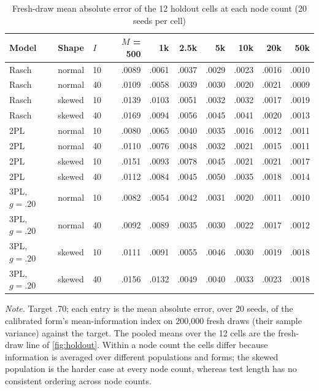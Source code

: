 \begin{table}[!htbp]
\centering
\caption{Fresh-draw mean absolute error of the 12 holdout cells at each node count (20 seeds per cell)}
\label{tab:holdout-cell}
\footnotesize
\setlength{\tabcolsep}{2.2pt}
\begin{tabular}{lllrrrrrrr}
\toprule
Model & Shape & $I$ & $M$ = 500 & 1k & 2.5k & 5k & 10k & 20k & 50k \\
\midrule
Rasch & normal & 10 & .0089 & .0061 & .0037 & .0029 & .0023 & .0016 & .0010 \\
Rasch & normal & 40 & .0109 & .0058 & .0039 & .0030 & .0020 & .0021 & .0009 \\
Rasch & skewed & 10 & .0139 & .0103 & .0051 & .0032 & .0032 & .0017 & .0019 \\
Rasch & skewed & 40 & .0169 & .0094 & .0056 & .0045 & .0041 & .0020 & .0013 \\
2PL & normal & 10 & .0080 & .0065 & .0040 & .0035 & .0016 & .0012 & .0011 \\
2PL & normal & 40 & .0110 & .0076 & .0048 & .0032 & .0021 & .0015 & .0011 \\
2PL & skewed & 10 & .0151 & .0093 & .0078 & .0045 & .0021 & .0021 & .0017 \\
2PL & skewed & 40 & .0112 & .0084 & .0045 & .0050 & .0035 & .0018 & .0014 \\
3PL, $g=.20$ & normal & 10 & .0082 & .0054 & .0042 & .0031 & .0020 & .0011 & .0010 \\
3PL, $g=.20$ & normal & 40 & .0092 & .0089 & .0035 & .0030 & .0022 & .0017 & .0012 \\
3PL, $g=.20$ & skewed & 10 & .0111 & .0091 & .0055 & .0046 & .0030 & .0019 & .0018 \\
3PL, $g=.20$ & skewed & 40 & .0156 & .0132 & .0049 & .0040 & .0033 & .0023 & .0018 \\
\bottomrule
\end{tabular}

\smallskip
\begin{minipage}{0.95\textwidth}
\footnotesize
\emph{Note.} Target .70; each entry is the mean absolute error, over 20 seeds, of the calibrated form's mean-information index on 200,000 fresh draws (their sample variance) against the target. The pooled means over the 12 cells are the fresh-draw line of \cref{fig:holdout}. Within a node count the cells differ because information is averaged over different populations and forms; the skewed population is the harder case at every node count, whereas test length has no consistent ordering across node counts.
\end{minipage}
\end{table}
